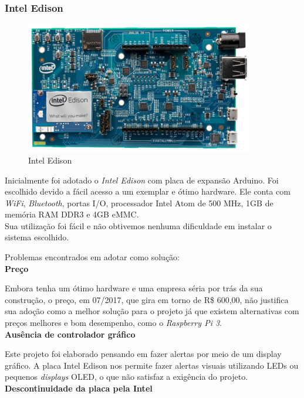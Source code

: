 \documentclass[
	12pt,				%
	oneside,			%
	a4paper,			%
	brazil				%
]{abntex2}
\begin{document}
\subsubsection{Intel Edison}

\begin{figure}[H]
\centering
\includegraphics[width=10cm, center]{images/intel-edison-arduino-kit}
\caption{Intel Edison}
\label{Rotulo}
\end{figure}

Inicialmente foi adotado o \textit{Intel Edison} com placa de expansão Arduino. Foi escolhido devido a fácil acesso a um exemplar e ótimo hardware. Ele conta com \textit{WiFi}, \textit{Bluetooth}, portas I/O, processador Intel Atom de 500 MHz, 1GB de memória RAM DDR3 e 4GB eMMC. \\

Sua utilização foi fácil e não obtivemos nenhuma dificuldade em instalar o sistema escolhido.


Problemas encontrados em adotar como solução:
\\

\textbf{Preço}

Embora tenha um ótimo hardware e uma empresa séria por trás da sua construção, o preço, em 07/2017, que gira em torno de R\$ 600,00, não justifica sua adoção como a melhor solução para o projeto já que existem alternativas com preços melhores e bom desempenho, como o \textit{Raspberry Pi 3}.
\\

\textbf{Ausência de controlador gráfico}

Este projeto foi elaborado pensando em fazer alertas por meio de um display gráfico. A placa Intel Edison nos permite fazer alertas visuais utilizando LEDs ou pequenos \textit{displays} OLED, o que não satisfaz a exigência do projeto.  
\\

\textbf{Descontinuidade da placa pela Intel}
\end{document}
